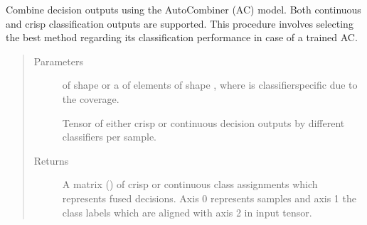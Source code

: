 \documentclass[letterpaper,10pt,english]{sphinxmanual}
\begin{document}
\begin{fulllineitems}
\begin{fulllineitems}
\label{\detokenize{pusion.auto.auto_combiner:pusion.auto.auto_combiner.AutoCombiner.combine}}
\sphinxAtStartPar
Combine decision outputs using the AutoCombiner (AC) model. Both continuous and crisp classification outputs are
supported. This procedure involves selecting the best method regarding its classification performance in case
of a trained AC.
\begin{quote}\begin{description}
\item[{Parameters}] \leavevmode
\sphinxAtStartPar
{} \textendash{} 
\sphinxAtStartPar
{} of shape  or a  of
 elements of shape , where  is classifier\sphinxhyphen{}specific
due to the coverage.

\sphinxAtStartPar
Tensor of either crisp or continuous decision outputs by different classifiers per sample.


\item[{Returns}] \leavevmode
\sphinxAtStartPar
A matrix () of crisp or continuous class assignments which represents fused decisions.
Axis 0 represents samples and axis 1 the class labels which are aligned with axis 2 in
 input tensor.

\end{description}\end{quote}

\end{fulllineitems}



\end{fulllineitems}
\end{document}
